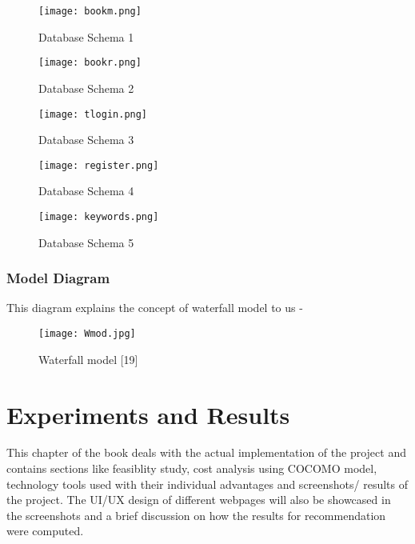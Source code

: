 \documentclass[a4paper,12pt]{report}
\begin{document}
\begin{figure}[h!]
\centering
\texttt{[image: bookm.png]}
\caption{Database Schema 1}
\end{figure}

\begin{figure}[h!]
\centering
\texttt{[image: bookr.png]}
\caption{Database Schema 2}
\end{figure}

\pagebreak
\FloatBarrier

\begin{figure}[h!]
\centering
\texttt{[image: tlogin.png]}
\caption{Database Schema 3}
\end{figure}

\begin{figure}[h!]
\centering
\texttt{[image: register.png]}
\caption{Database Schema 4}
\end{figure}

\begin{figure}[h!]
\centering
\texttt{[image: keywords.png]}
\caption{Database Schema 5}
\end{figure}

\FloatBarrier
\subsection{Model Diagram}
\par This diagram explains the concept of waterfall model to us - \\
\begin{figure}[h!]
  \centering
  \texttt{[image: Wmod.jpg]}
  \caption{Waterfall model [19]}
\end{figure}
\FloatBarrier



\chapter{Experiments and Results}

\par This chapter of the book deals with the actual implementation of the project and contains sections like feasiblity study, cost analysis using COCOMO model, technology tools used with their individual advantages and screenshots/ results of the project. The UI/UX design of different webpages will also be showcased in the screenshots and a brief discussion on how the results for recommendation were computed. \\
\end{document}
